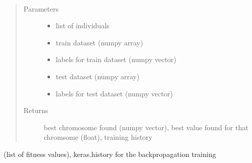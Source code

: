 \documentclass[letterpaper,10pt,english]{sphinxmanual}
\begin{document}
\begin{fulllineitems}
\begin{fulllineitems}
\end{fulllineitems}


\begin{fulllineitems}
\label{\detokenize{index:genetic_optimizer.GeneticNeuralWeightOptimizer.fit}}~\begin{quote}\begin{description}
\item[{Parameters}] \leavevmode\begin{itemize}
\item {} 
 \textendash{} list of individuals

\item {} 
 \textendash{} train dataset (numpy array)

\item {} 
 \textendash{} labels for train dataset (numpy vector)

\item {} 
 \textendash{} test dataset (numpy array)

\item {} 
 \textendash{} labels for test dataset (numpy vector)

\end{itemize}

\item[{Returns}] \leavevmode
best chromosome found (numpy vector), best value found for that chromsome (float), training history

\end{description}\end{quote}

(list of fitness values), keras.history for the backpropagation training

\end{fulllineitems}



\end{fulllineitems}
\end{document}
